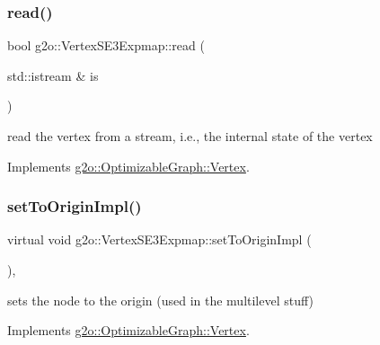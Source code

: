 \mbox{\label{classg2o_1_1_vertex_s_e3_expmap_a4f5913373d24ea5963fffc6830406a52}} 
\subsubsection{\texorpdfstring{read()}{read()}}
{\footnotesize\ttfamily bool g2o\+::\+Vertex\+S\+E3\+Expmap\+::read (\begin{DoxyParamCaption}\item[{std\+::istream \&}]{is }\end{DoxyParamCaption})\hspace{0.3cm}{\ttfamily [virtual]}}



read the vertex from a stream, i.\+e., the internal state of the vertex 



Implements \mbox{\hyperlink{classg2o_1_1_optimizable_graph_1_1_vertex_a356c40d33c3f1e07afa938dfb4870230}{g2o\+::\+Optimizable\+Graph\+::\+Vertex}}.

\mbox{\label{classg2o_1_1_vertex_s_e3_expmap_a0d12948c1fb058698bc58177db3806b1}} 
\subsubsection{\texorpdfstring{set\+To\+Origin\+Impl()}{setToOriginImpl()}}
{\footnotesize\ttfamily virtual void g2o\+::\+Vertex\+S\+E3\+Expmap\+::set\+To\+Origin\+Impl (\begin{DoxyParamCaption}{ }\end{DoxyParamCaption})\hspace{0.3cm}{\ttfamily [inline]}, {\ttfamily [virtual]}}



sets the node to the origin (used in the multilevel stuff) 



Implements \mbox{\hyperlink{classg2o_1_1_optimizable_graph_1_1_vertex_abd5fe36815f27a9c174ad41c2070c247}{g2o\+::\+Optimizable\+Graph\+::\+Vertex}}.

